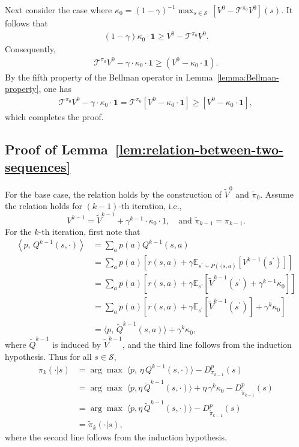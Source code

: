 \documentclass[10pt]{article}
\newcommand{\calS}{\mathcal{S}}
\newcommand{\calT}{\mathcal{T}}
\newcommand{\E}{\mathbb{E}}
\newcommand{\ls}{\left}
\newcommand{\rs}{\right}
\newcommand{\la}{\ls\langle}
\newcommand{\ra}{\rs\rangle}
\theoremstyle{plain}
\theoremstyle{definition}
\begin{document}
Next consider the case where $\kappa_0 = (1-\gamma)^{-1}\max_{s\in\calS} \, [V^0 - \calT^{\pi_0}V^0](s)$. It follows that
\begin{align*}
    (1-\gamma) \kappa_0 \cdot \mathbf{1} \geq V^0 - \calT^{\pi_0} V^0.
\end{align*}
Consequently,
\begin{align*}
    \calT^{\pi_0} V^0 - \gamma\cdot \kappa_0 \cdot \mathbf{1} \geq (V^0 - \kappa_0 \cdot \mathbf{1}).
\end{align*}
By the fifth property of the Bellman operator in Lemma~\ref{lemma:Bellman-property}, one has
\begin{align*}
    \calT^{\pi_0} V^0 - \gamma\cdot \kappa_0 \cdot \mathbf{1} = \calT^{\pi_0} [ V^0 - \kappa_0 \cdot \mathbf{1}] \geq [V^0 - \kappa_0 \cdot \mathbf{1}],
\end{align*}
which completes the proof.

\subsection{Proof of Lemma~\ref{lem:relation-between-two-sequences}}
\label{sec:pf:lem:relation-between-two-sequences}
For the base case, the relation holds by the construction of $\tilde{V}^0$ and $\tilde{\pi}_0$. Assume the relation holds for $(k-1)$-th iteration, i.e.,
\[
V^{k-1} = \tilde{V}^{k-1}+\gamma^{k-1}\cdot\kappa_0\cdot 1,\quad\mbox{and }\tilde{\pi}_{k-1}=\pi_{k-1}.
\]
For the $k$-th iteration, first note that
\begin{align*}
    \la p, \, {Q}^{k-1}(s,\cdot) \ra &= \sum_a p(a) Q^{k-1}(s,a) \\
    &= \sum_a p(a) [r(s,a) + \gamma \E_{s^\prime \sim P(\cdot | s,a)} [V^{k-1}(s^\prime)] ] \\
    &= \sum_{a} p(a) [r(s,a) + \gamma \E_{s^\prime}[\tilde{V}^{k-1}(s^\prime) + \gamma^{k-1} \kappa_0]] \\
    &= \sum_a p(a) [r(s,a) + \gamma \E_{s^\prime}[\tilde{V}^{k-1}(s^\prime)] + \gamma^{k}\kappa_0] \\
    &= \langle p, \, \tilde{Q}^{k-1}(s,a) \rangle + \gamma^{k} \kappa_0,
\end{align*}
where $\tilde{Q}^{k-1}$ is induced by $\tilde{V}^{k-1}$, and the third line follows from the induction hypothesis. Thus for all $s\in\calS$,
\begin{align*}
    \pi_{k}(\cdot|s) &= \arg\max \; \langle p, \, \eta \,Q^{k-1}(s,\cdot) \rangle - D^p_{\pi_{k-1}}(s)\\
    &= \arg\max \; \langle p, \eta\, \tilde{Q}^{k-1}(s,\cdot) \rangle + \eta \,\gamma^{k} \kappa_0 - D^p_{\tilde{\pi}_{k-1}}(s)\\
    &= \arg\max \; \langle p, \eta\, \tilde{Q}^{k-1}(s,\cdot) \rangle - D^{p}_{\tilde{\pi}_{k-1}}(s)\\
    &= \tilde{\pi}_k(\cdot|s),
\end{align*}
where the second line follows from the induction hypothesis. 
\end{document}
